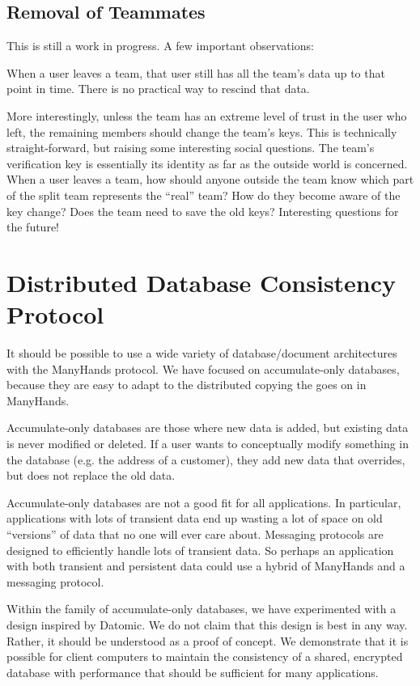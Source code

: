 \documentclass[pldi-cameraready,10pt]{sigplanconf-pldi16}
\begin{document}
\subsection{Removal of Teammates}

This is still a work in progress.
A few important observations:

When a user leaves a team, that user still has all the team's data up to that point in time.
There is no practical way to rescind that data.

More interestingly, unless the team has an extreme level of trust in the user who left, the remaining members should change the team's keys.
This is technically straight-forward, but raising some interesting social questions.
The team's verification key is essentially its identity as far as the outside world is concerned.
When a user leaves a team, how should anyone outside the team know which part of the split team represents the ``real'' team?
How do they become aware of the key change?
Does the team need to save the old keys?
Interesting questions for the future!

\section{Distributed Database Consistency Protocol}

It should be possible to use a wide variety of database/document architectures with the ManyHands protocol.
We have focused on accumulate-only databases, because they are easy to adapt to the distributed copying the goes on in ManyHands.

Accumulate-only databases are those where new data is added, but existing data is never modified or deleted.
If a user wants to conceptually modify something in the database (e.g. the address of a customer), they add new data that overrides, but does not replace the old data.

Accumulate-only databases are not a good fit for all applications.
In particular, applications with lots of transient data end up wasting a lot of space on old ``versions'' of data that no one will ever care about.
Messaging protocols are designed to efficiently handle lots of transient data.
So perhaps an application with both transient and persistent data could use a hybrid of ManyHands and a messaging protocol.

Within the family of accumulate-only databases, we have experimented with a design inspired by Datomic.
We do not claim that this design is best in any way.
Rather, it should be understood as a proof of concept.
We demonstrate that it is possible for client computers to maintain the consistency of a shared, encrypted database with performance that should be sufficient for many applications.
\end{document}
